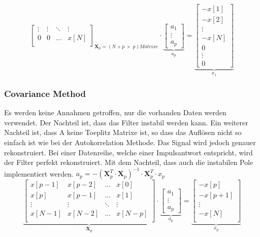 \begin{aufzaehlung}
$${\begin{bmatrix}
    		\vdots & \vdots & \ddots & \vdots \\                     
    		0 & 0 & \hdots & x[N] \\
		\end{bmatrix}  }_{\bm X_p=(N+p \; \times \; p) Matrixe} \cdot \underbrace{\begin{bmatrix}
    		a_1 \\
    		\vdots \\
    		a_p
		\end{bmatrix}  }_{a_p}= \underbrace{\begin{bmatrix}
    		 -x [1]\\            
    		 -x [2]\\
    		\vdots \\
    		 -x [N]\\
    		0 \\
    		\vdots \\
    		0
		\end{bmatrix}}_{x_1} 
		 $$ \normalsize
	\end{aufzaehlung}
	
\subsubsection{Covariance Method  }
Es werden keine Annahmen getroffen, nur die vorhanden Daten werden verwendet. Der Nachteil ist, dass das Filter instabil werden kann. 
Ein weiterer Nachteil ist, dass A keine Toeplitz Matrixe ist, so dass das Auflösen nicht so einfach ist wie bei der Autokorrelation Methode. 
Das Signal wird jedoch genauer rekonstruiert. Bei einer Datenreihe, welche einer Impulsantwort entspricht, wird der Filter perfekt rekonstruiert. 
Mit dem Nachteil, dass auch die instabilen Pole implementiert werden. $a_p = -\left(\bm X_p^T \cdot \bm  X_p\right)^{-1} \cdot \bm X_p^T \cdot x_p$  \small
		$$
		\underbrace{\begin{bmatrix}               
    		x[p-1] & x[p-2] & \hdots & x[0] \\                                   
    		x[p] & x[p-1] & \hdots & x[1] \\      
    		\vdots & \vdots & \ddots & \vdots \\                        
    		x[N-1] & x[N-2] & \hdots & x[N-p] \\ 
		\end{bmatrix}  }_{\bm X_p} \cdot \underbrace{\begin{bmatrix}
    		a_1 \\
    		\vdots \\
    		a_p
		\end{bmatrix}  }_{a_p}= \underbrace{\begin{bmatrix}
    		 -x[p]\\            
    		 -x[p+1]\\
    		\vdots \\
    		 -x[N]\\
		\end{bmatrix}}_{x_p} 
		 $$ \normalsize
\vspace{-0.6cm}

